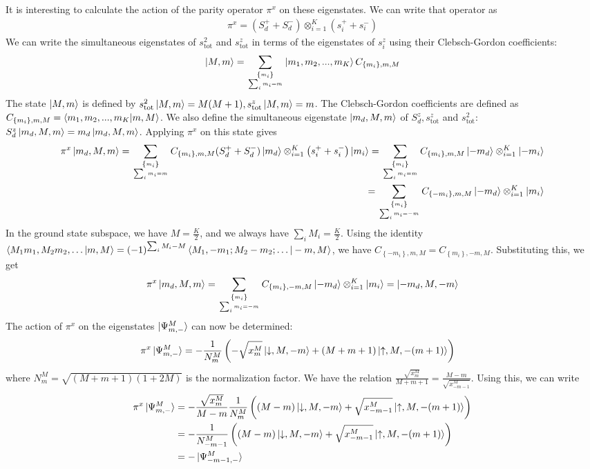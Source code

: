 \documentclass[12pt]{revtex4-2}
\begin{document}
It is interesting to calculate the action of the parity operator \(\pi^x\) on these eigenstates. We can write that operator as
\begin{align}
	\pi^x = (S_d^+ + S_d^-)\otimes_{i=1}^K \left(s_i^+ + s_i^-\right) 
\end{align}
We can write the simultaneous eigenstates of \(s^2_\text{tot}\) and \(s_\text{tot}^z\) in terms of the eigenstates of \(s_i^z\) using their Clebsch-Gordon coefficients:
\begin{align}
	\ket{M,m} = \sum_{\left\{m_i\right\}\atop{\sum_i m_i = m}}\ket{m_1,m_2,...,m_K} C_{\left\{m_i\right\},m,M}
\end{align}
The state \(\ket{M,m}\) is defined by \(s_\text{tot}^2\ket{M,m} = M(M+1), s^z_\text{tot}\ket{M,m} = m\). The Clebsch-Gordon coefficients are defined as \(C_{\left\{m_i\right\},m,M} = \braket{m_1,m_2,...,m_K|m,M}\). We also define the simultaneous eigenstate \(\ket{m_d, M, m}\) of \(S_d^z,s_\text{tot}^z\) and \(s^2_\text{tot}\): \(S_d^z\ket{m_d, M, m} = m_d\ket{m_d, M, m}\). Applying \(\pi^x\) on this state gives
\begin{align}
	\pi^x \ket{m_d, M,m} = \sum_{\left\{m_i\right\}\atop{\sum_i m_i = m}}C_{\left\{m_i\right\},m,M}(S_d^+ + S_d^-)\ket{m_d}\otimes_{i=1}^K \left(s_i^+ + s_i^-\right)\ket{m_i} = \sum_{\left\{m_i\right\}\atop{\sum_i m_i = m}}C_{\left\{m_i\right\},m,M}\ket{-m_d}\otimes_{i=1}^K\ket{-m_i}\\
	=\sum_{\left\{m_i\right\}\atop{\sum_i m_i = -m}}C_{\left\{-m_i\right\},m,M}\ket{-m_d}\otimes_{i=1}^K\ket{m_i}
\end{align}
In the ground state subspace, we have \(M = \frac{K}{2}\), and we always have \(\sum_i M_i = \frac{K}{2}\). Using the identity \(\braket{M_1m_1,M_2m_2,\ldots|m,M} = \left( -1 \right)^{\sum_i M_i - M}\braket{M_1, -m_1; M_2 -m_2;\ldots|-m,M}\), we have \(C_{\left\{-m_i\right\},m,M} = C_{\left\{m_i\right\},-m,M}\). Substituting this, we get
\begin{align}
	\pi^x \ket{m_d, M,m} = \sum_{\left\{m_i\right\}\atop{\sum_i m_i = -m}}C_{\left\{m_i\right\},-m,M}\ket{-m_d}\otimes_{i=1}^K\ket{m_i} = \ket{-m_d, M, -m}
\end{align}
The action of \(\pi^x\) on the eigenstates \(\ket{\Psi^M_{m,-}}\) can now be determined:
\begin{align}
	\pi^x \ket{\Psi^M_{m,-}} &=- \frac{1}{N^M_m}\left(-\sqrt{x^M_m}\ket{\downarrow,M,-m} + (M+m+1)\ket{\uparrow,M,-(m+1)}\right)
\end{align}
where \(N^M_m = \sqrt{(M+m+1)(1+2M)}\) is the normalization factor. We have the relation \(\frac{\sqrt{x^M_m}}{M+m+1} = \frac{M-m}{\sqrt{x^M_{-m-1}}}\). Using this, we can write
\begin{equation}\begin{aligned}
	\pi^x \ket{\Psi^M_{m,-}} &=-\frac{\sqrt{x^M_m}}{M-m}\frac{1}{N^M_m}\left((M-m)\ket{\downarrow,M,-m} + \sqrt{x^M_{-m-1}}\ket{\uparrow,M,-(m+1)}\right) \\
				 &= -\frac{1}{N^M_{-m-1}}\left((M-m)\ket{\downarrow,M,-m} + \sqrt{x^M_{-m-1}}\ket{\uparrow,M,-(m+1)}\right) \\
				 &= -\ket{\Psi^M_{-m-1,-}}
\end{aligned}\end{equation}
\end{document}
